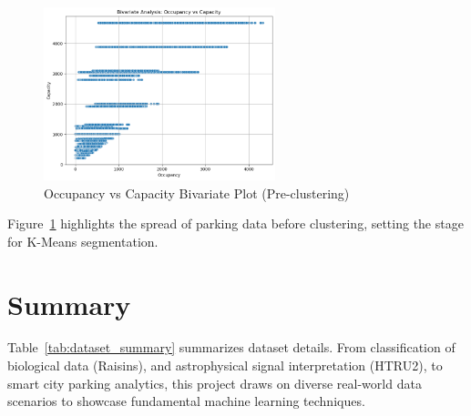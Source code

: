 \begin{figure}[H]
    \centering
    \includegraphics[width=0.6\textwidth]{figures/parking_scatter.png}
    \caption{Occupancy vs Capacity Bivariate Plot (Pre-clustering)}
    \label{fig:parking_scatter}
\end{figure}

Figure~\ref{fig:parking_scatter} highlights the spread of parking data before clustering, setting the stage for K-Means segmentation.

\section{Summary}
\label{sec:dataset_summary}

Table~\ref{tab:dataset_summary} summarizes dataset details. From classification of biological data (Raisins), and astrophysical signal interpretation (HTRU2), to smart city parking analytics, this project draws on diverse real-world data scenarios to showcase fundamental machine learning techniques.
